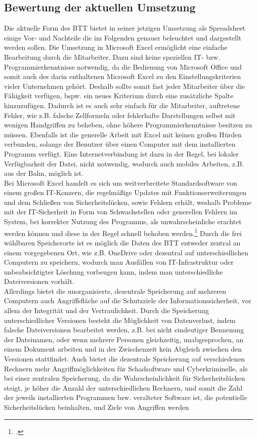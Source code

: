 \subsection{Bewertung der aktuellen Umsetzung}
Die aktuelle Form des BTT bietet in seiner jetzigen Umsetzung als Spreadsheet einige Vor- und Nachteile die im Folgenden genauer beleuchtet und dargestellt werden sollen. Die Umsetzung in Microsoft Excel ermöglicht eine einfache Bearbeitung durch die Mitarbeiter. Dazu sind keine speziellen IT- bzw. Programmierkenntnisse notwendig, da die Bedienung von Microsoft Office und somit auch des darin enthaltenen Microsoft Excel zu den Einstellungskriterien vieler Unternehmen gehört. Deshalb sollte somit fast jeder Mitarbeiter über die Fähigkeit verfügen, bspw. ein neues Kriterium durch eine zusätzliche Spalte hinzuzufügen. Dadurch ist es auch sehr einfach für die Mitarbeiter, auftretene Fehler, wie z.B. falsche Zellformeln oder fehlerhafte Darstellungen selbst mit wenigen Handgriffen zu beheben, ohne höhere Programmierkenntnisse besitzen zu müssen. Ebenfalls ist die generelle Arbeit mit Excel mit keinen großen Hürden verbunden, solange der Benutzer über einen Computer mit dem installierten Programm verfügt. Eine Internetverbindung ist dazu in der Regel, bei lokaler Verfügbarkeit der Datei, nicht notwendig, wodurch auch mobiles Arbeiten, z.B. aus der Bahn, möglich ist.\\Bei Microsoft Excel handelt es sich um weitverbreitete Standardsoftware von einem großen IT-Konzern, die regelmäßige Updates mit Funktionserweiterungen und dem Schließen von Sicherheitslücken, sowie Fehlern erhält, weshalb Probleme mit der IT-Sicherheit in Form von Schwachstellen oder generellen Fehlern im System, bei korrekter Nutzung des Programms, als unwahrscheinliche erachtet werden können und diese in der Regel schnell behoben werden.\footcite[Vgl.][]{ms-sicherheit} Durch die frei wählbaren Speicherorte ist es möglich die Daten des BTT entweder zentral an einem vorgegebenen Ort, wie z.B. OneDrive oder dezentral auf unterschiedlichen Computern zu speichern, wodurch man Ausfällen von IT-Infrastruktur oder unbeabsichtigter Löschung vorbeugen kann, indem man unterschiedliche Dateiversionen vorhält.\\Allerdings bietet die unorganisierte, dezentrale Speicherung auf mehreren Computern auch Angriffsfläche auf die Schutzziele der Informationssicherheit, vor allem der Integrität und der Vertraulichkeit. Durch die Speicherung unterschiedlicher Versionen besteht die Möglichkeit von Datenverlust, indem falsche Dateiversionen bearbeitet werden, z.B. bei nicht eindeutiger Bennenung der Dateinamen, oder wenn mehrere Personen gleichzeitig, unabgesprochen, an einem Dokument arbeiten und in der Zwischenzeit kein Abgleich zwischen den Versionen stattfindet. Auch bietet die dezentrale Speicherung auf verschiedenen Rechnern mehr Angriffmöglichkeiten für Schadsoftware und Cyberkriminelle, als bei einer zentralen Speicherung, da die Wahrscheinlichkeit für Sicherheitslücken steigt, je höher die Anzahl der unterschiedlichen Rechnern, und somit die Zahl der jeweils installierten Programmen bzw. veralteter Software ist, die potentielle Sicherheitslücken beinhalten, und Ziele von Angriffen werden 